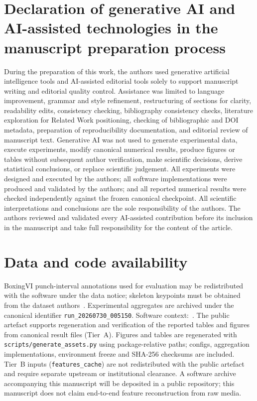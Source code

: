 \documentclass[preprint,12pt,numbers,sort&compress]{elsarticle}
\begin{document}
\section*{Declaration of generative AI and AI-assisted technologies in the manuscript preparation process}
During the preparation of this work, the authors used generative artificial intelligence tools and AI-assisted editorial tools solely to support manuscript writing and editorial quality control.
Assistance was limited to language improvement, grammar and style refinement, restructuring of sections for clarity, readability edits, consistency checking, bibliography consistency checks, literature exploration for Related Work positioning, checking of bibliographic and DOI metadata, preparation of reproducibility documentation, and editorial review of manuscript text.
Generative AI was not used to generate experimental data, execute experiments, modify canonical numerical results, produce figures or tables without subsequent author verification, make scientific decisions, derive statistical conclusions, or replace scientific judgement.
All experiments were designed and executed by the authors; all software implementations were produced and validated by the authors; and all reported numerical results were checked independently against the frozen canonical checkpoint.
All scientific interpretations and conclusions are the sole responsibility of the authors.
The authors reviewed and validated every AI-assisted contribution before its inclusion in the manuscript and take full responsibility for the content of the article.

\section*{Data and code availability}
\label{sec:reproducibility}
BoxingVI punch-interval annotations used for evaluation may be redistributed with the software under the data notice; skeleton keypoints must be obtained from the dataset authors~\cite{kumar2025boxingvi}.
Experimental aggregates are archived under the canonical identifier \texttt{run\_20260730\_005150}.
Software context:~\cite{fightsafe_ai_2026}.
The public artefact supports regeneration and verification of the reported tables and figures from canonical result files (Tier~A).
Figures and tables are regenerated with \texttt{scripts/generate\_assets.py} using package-relative paths; configs, aggregation implementations, environment freeze and SHA-256 checksums are included.
Tier~B inputs (\texttt{features\_cache}) are not redistributed with the public artefact and require separate upstream or institutional clearance.
A software archive accompanying this manuscript will be deposited in a public repository; this manuscript does not claim end-to-end feature reconstruction from raw media.
\end{document}
